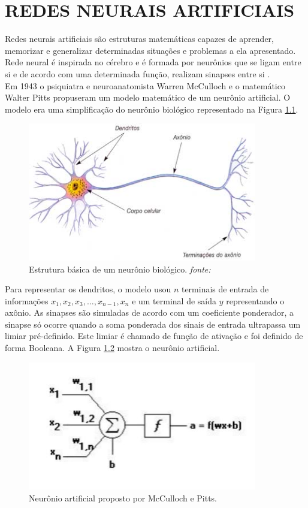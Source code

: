 \chapter{REDES NEURAIS ARTIFICIAIS}
\label{chap:ann}
\quad Redes neurais artificiais são estruturas matemáticas capazes de aprender, memorizar e generalizar determinadas situações e problemas a ela apresentado. Rede neural é inspirada no cérebro e é formada por neurônios que se ligam entre si e de acordo com uma determinada função, realizam sinapses entre si \cite{hay}.\\

Em 1943 o psiquiatra e neuroanatomista Warren McCulloch e o matemático Walter Pitts propuseram um modelo matemático de um neurônio artificial. O modelo era uma simplificação do neurônio biológico representado na Figura \ref{fig:neur}. 

\begin{figure}[H]
\centering %
\includegraphics[width=10cm]{img/neuronio.jpg} %
\caption{Estrutura básica de um neurônio biológico. \textit{fonte:\cite{barroso}}}
\label{fig:neur}
\end{figure}

Para representar os dendritos, o modelo usou $n$ terminais de entrada de informações $x_1, x_2, x_3, \dots, x_{n-1}, x_n$ e um terminal de saída $y$ representando o axônio. As sinapses são  simuladas de acordo com um coeficiente ponderador, a sinapse só ocorre quando a soma ponderada dos sinais de entrada ultrapassa um limiar pré-definido. Este limiar é chamado de função de ativação e foi definido de forma Booleana. A Figura \ref{fig:ann} mostra o neurônio artificial.

\begin{figure}[H]
\centering %
\includegraphics[width=10cm]{img/neura.jpg} %
\caption{Neurônio artificial proposto por McCulloch e Pitts. \textit{\cite{fia}} }
\label{fig:ann}
\end{figure}

